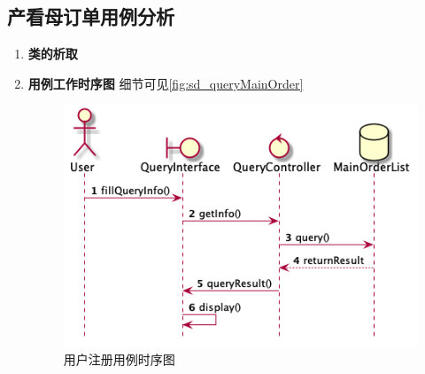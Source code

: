 	\subsection{产看母订单用例分析} %
	\label{sub:产看母订单用例分析}
	\begin{enumerate}
		\item \textbf{类的析取}

		\item \textbf{用例工作时序图}
		细节可见\autoref{fig:sd_queryMainOrder}

		\begin{figure}[htp]
		    \centering
		    \includegraphics[width=12cm]{figure/sequenceDiagram/sd_query.png}
		    \caption{用户注册用例时序图}
		    \label{fig:sd_queryMainOrder}
		\end{figure}

	\end{enumerate}
	

